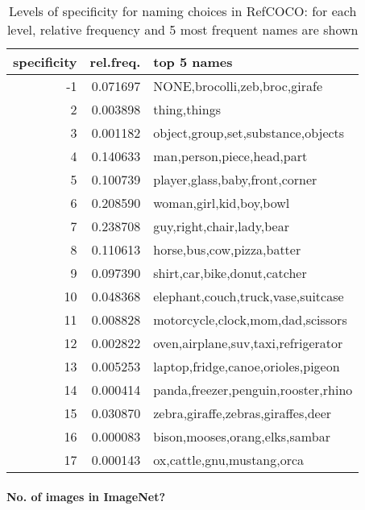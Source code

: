 \begin{table}
\centering
\setlength{\tabcolsep}{4pt}
\begin{tabular}{rrl}
\toprule
 specificity &  rel.freq. &                          top 5 names \\
\midrule
          -1 &   0.071697 &      NONE,brocolli,zeb,broc,girafe \\
           2 &   0.003898 &                         thing,things \\
           3 &   0.001182 &   object,group,set,substance,objects \\
           4 &   0.140633 &           man,person,piece,head,part \\
           5 &   0.100739 &       player,glass,baby,front,corner \\
           6 &   0.208590 &              woman,girl,kid,boy,bowl \\
           7 &   0.238708 &            guy,right,chair,lady,bear \\
           8 &   0.110613 &           horse,bus,cow,pizza,batter \\
           9 &   0.097390 &         shirt,car,bike,donut,catcher \\
          10 &   0.048368 &   elephant,couch,truck,vase,suitcase \\
          11 &   0.008828 &    motorcycle,clock,mom,dad,scissors \\
          12 &   0.002822 &  oven,airplane,suv,taxi,refrigerator \\
          13 &   0.005253 &   laptop,fridge,canoe,orioles,pigeon \\
          14 &   0.000414 &  panda,freezer,penguin,rooster,rhino \\
          15 &   0.030870 &   zebra,giraffe,zebras,giraffes,deer \\
          16 &   0.000083 &       bison,mooses,orang,elks,sambar \\
          17 &   0.000143 &           ox,cattle,gnu,mustang,orca \\
\bottomrule
\end{tabular}\caption{Levels of specificity for naming choices in RefCOCO: for each level, relative frequency and 5 most frequent names are shown}
\label{tab:specnames}
\end{table}

\paragraph{No. of images in ImageNet?}